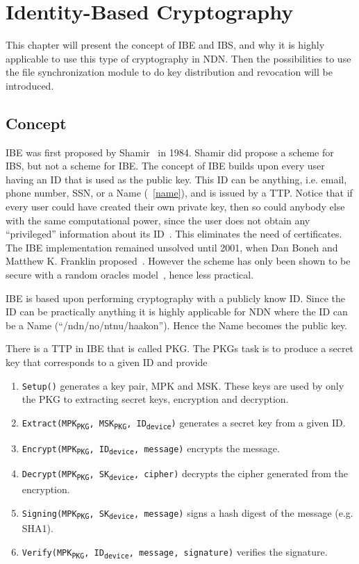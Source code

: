 \chapter{Identity-Based Cryptography}
This chapter will present the concept of \gls{IBE} and \gls{IBS}, and why it is highly applicable to use this type of cryptography in \gls{NDN}. 
Then the possibilities to use the file synchronization module to do key distribution and revocation will be introduced.

\section{Concept}\label{ibc}
\gls{IBE} was first proposed by Shamir~\cite{DBLP:conf/crypto/Shamir84} in 1984. 
Shamir did propose a scheme for \gls{IBS}, but not a scheme for \gls{IBE}. 
The concept of \gls{IBE} builds upon every user having an \gls{ID} that is used as the public key. 
This \gls{ID} can be anything, i.e. email, phone number, \gls{SSN}, or a Name (~\autoref{name}), and is issued by a \gls{TTP}.
Notice that if every user could have created their own private key, then so could anybody else with the same computational power, since the user does not obtain any ``privileged'' information about its \gls{ID}~\cite{Bidgoli06}.
This eliminates the need of certificates.
The \gls{IBE} implementation remained unsolved until 2001, when Dan Boneh and Matthew K. Franklin proposed~\cite{DBLP:conf/crypto/BonehF01}.
However the scheme has only been shown to be secure with a random oracles model~\cite{DBLP:journals/iacr/Waters04}, hence less practical.


\gls{IBE} is based upon performing cryptography with a publicly know \gls{ID}.
Since the \gls{ID} can be practically anything it is highly applicable for \gls{NDN} where the \gls{ID} can be a Name (``/ndn/no/ntnu/haakon'').
Hence the Name becomes the public key. 

There is a \gls{TTP} in \gls{IBE} that is called \gls{PKG}.
The \gls{PKG}s task is to produce a secret key that corresponds to a given ID and provide 

\begin{enumerate}\label{ibc-methods}
  \item \texttt{Setup()} generates a key pair, \gls{MPK} and \gls{MSK}. These keys are used by only the \gls{PKG} to extracting secret keys, encryption and decryption.
  \item \texttt{Extract(MPK\textsubscript{PKG}, MSK\textsubscript{PKG}, ID\textsubscript{device})} generates a secret key from a given ID. 
  \item \texttt{Encrypt(MPK\textsubscript{PKG}, ID\textsubscript{device}, message)} encrypts the message.
  \item \texttt{Decrypt(MPK\textsubscript{PKG}, SK\textsubscript{device}, cipher)} decrypts the cipher generated from the encryption.
  \item \texttt{Signing(MPK\textsubscript{PKG}, SK\textsubscript{device}, message)} signs a hash digest of the message (e.g. \gls{SHA1}).
  \item \texttt{Verify(MPK\textsubscript{PKG}, ID\textsubscript{device}, message, signature)} verifies the signature.
\end{enumerate}

